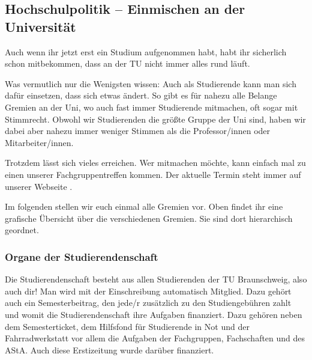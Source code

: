 
\subsection{Hochschulpolitik -- Einmischen an der Universität}

Auch wenn ihr jetzt erst ein Studium aufgenommen habt, habt ihr sicherlich 
schon mitbekommen, dass an der TU nicht immer alles rund läuft.

Was vermutlich nur die Wenigsten wissen: Auch als Studierende kann man sich 
dafür einsetzen, dass sich etwas ändert. So gibt es für nahezu alle Belange Gremien 
an der Uni, wo auch fast immer Studierende mitmachen, oft sogar mit Stimmrecht. 
Obwohl wir Studierenden die größte Gruppe der Uni sind, haben wir dabei aber nahezu immer 
weniger Stimmen als die Professor/innen oder Mitarbeiter/innen. 

Trotzdem lässt sich vieles erreichen. Wer mitmachen möchte, kann einfach 
mal zu einen unserer Fachgruppentreffen kommen. Der aktuelle Termin steht immer 
 auf unserer Webseite \fginfoUrl.

Im folgenden stellen wir euch einmal alle Gremien vor.
Oben findet ihr eine grafische Übersicht über die verschiedenen Gremien. Sie sind dort hierarchisch geordnet.

\subsubsection*{Organe der Studierendenschaft}

Die Studierendenschaft besteht aus allen Studierenden der TU Braunschweig, also auch dir!
Man wird mit der Einschreibung automatisch Mitglied. Dazu gehört auch ein Semesterbeitrag, den jede/r 
zusätzlich zu den Studiengebühren zahlt und womit die Studierendenschaft ihre Aufgaben finanziert. 
Dazu gehören neben dem Semesterticket, dem Hilfsfond für Studierende in Not und der 
Fahrradwerkstatt vor allem die Aufgaben der Fachgruppen, Fachschaften und des AStA. Auch diese
Erstizeitung wurde darüber finanziert.

